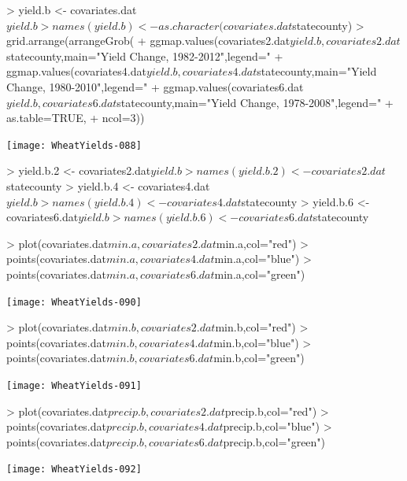 \documentclass{report}
\begin{document}
\begin{Schunk}
\begin{Sinput}
> yield.b <- covariates.dat$yield.b
> names(yield.b) <- as.character(covariates.dat$statecounty)
> grid.arrange(arrangeGrob(
+    ggmap.values(covariates2.dat$yield.b,covariates2.dat$statecounty,main="Yield Change, 1982-2012",legend="%
+    ggmap.values(covariates4.dat$yield.b,covariates4.dat$statecounty,main="Yield Change, 1980-2010",legend="%
+    ggmap.values(covariates6.dat$yield.b,covariates6.dat$statecounty,main="Yield Change, 1978-2008",legend="%
+    as.table=TRUE,
+    ncol=3))
\end{Sinput}
\end{Schunk}
\texttt{[image: WheatYields-088]}

\begin{Schunk}
\begin{Sinput}
> yield.b.2 <- covariates2.dat$yield.b
> names(yield.b.2) <- covariates2.dat$statecounty
> yield.b.4 <- covariates4.dat$yield.b
> names(yield.b.4) <-covariates4.dat$statecounty
> yield.b.6 <- covariates6.dat$yield.b
> names(yield.b.6) <-covariates6.dat$statecounty
\end{Sinput}
\end{Schunk}

\begin{Schunk}
\begin{Sinput}
> plot(covariates.dat$min.a,covariates2.dat$min.a,col="red")
> points(covariates.dat$min.a,covariates4.dat$min.a,col="blue")
> points(covariates.dat$min.a,covariates6.dat$min.a,col="green")
\end{Sinput}
\end{Schunk}
\texttt{[image: WheatYields-090]}

\begin{Schunk}
\begin{Sinput}
> plot(covariates.dat$min.b,covariates2.dat$min.b,col="red")
> points(covariates.dat$min.b,covariates4.dat$min.b,col="blue")
> points(covariates.dat$min.b,covariates6.dat$min.b,col="green")
\end{Sinput}
\end{Schunk}
\texttt{[image: WheatYields-091]}

\begin{Schunk}
\begin{Sinput}
> plot(covariates.dat$precip.b,covariates2.dat$precip.b,col="red")
> points(covariates.dat$precip.b,covariates4.dat$precip.b,col="blue")
> points(covariates.dat$precip.b,covariates6.dat$precip.b,col="green")
\end{Sinput}
\end{Schunk}
\texttt{[image: WheatYields-092]}
\end{document}
